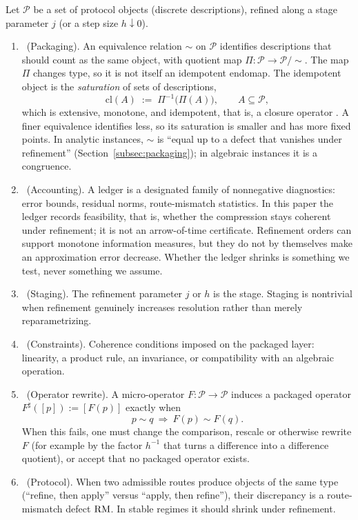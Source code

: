 \begin{remark}\label{rem:six-primitives}
Let $\mathcal P$ be a set of protocol objects (discrete descriptions), refined along a stage parameter $j$ (or a step size $h\downarrow 0$).
\begin{enumerate}
  \item \Pfive\ (Packaging). An equivalence relation $\sim$ on $\mathcal P$ identifies descriptions that should count as the same object, with quotient map $\Pi:\mathcal P\to\mathcal P/\!\sim$.
  The map $\Pi$ changes type, so it is not itself an idempotent endomap.
  The idempotent object is the \emph{saturation} of sets of descriptions,
  \[
    \mathrm{cl}(A)\;:=\;\Pi^{-1}\bigl(\Pi(A)\bigr),\qquad A\subseteq\mathcal P,
  \]
  which is extensive, monotone, and idempotent, that is, a closure operator \cite{DaveyPriestley2002}.
  A finer equivalence identifies less, so its saturation is smaller and has more fixed points.
  In analytic instances, $\sim$ is ``equal up to a defect that vanishes under refinement'' (Section~\ref{subsec:packaging}); in algebraic instances it is a congruence.

  \item \Psix\ (Accounting). A ledger is a designated family of nonnegative diagnostics: error bounds, residual norms, route-mismatch statistics.
  In this paper the ledger records feasibility, that is, whether the compression stays coherent under refinement; it is not an arrow-of-time certificate.
  Refinement orders can support monotone information measures, but they do not by themselves make an approximation error decrease. Whether the ledger shrinks is something we test, never something we assume.

  \item \Pfour\ (Staging). The refinement parameter $j$ or $h$ is the stage. Staging is nontrivial when refinement genuinely increases resolution rather than merely reparametrizing.

  \item \Ptwo\ (Constraints). Coherence conditions imposed on the packaged layer: linearity, a product rule, an invariance, or compatibility with an algebraic operation.

  \item \Pone\ (Operator rewrite). A micro-operator $F:\mathcal P\to\mathcal P$ induces a packaged operator $F^\sharp([p]):=[F(p)]$ exactly when
  \[
    p\sim q\ \Longrightarrow\ F(p)\sim F(q).
  \]
  When this fails, one must change the comparison, rescale or otherwise rewrite $F$ (for example by the factor $h^{-1}$ that turns a difference into a difference quotient), or accept that no packaged operator exists.

  \item \Pthree\ (Protocol). When two admissible routes produce objects of the same type (``refine, then apply'' versus ``apply, then refine''), their discrepancy is a route-mismatch defect $\mathrm{RM}$. In stable regimes it should shrink under refinement.
\end{enumerate}
\end{remark}

